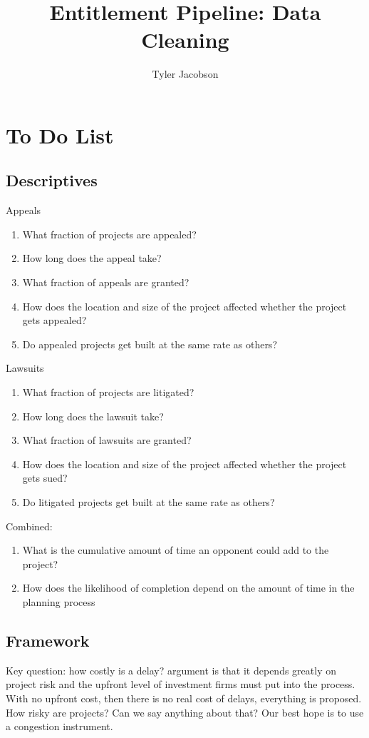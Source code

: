 \documentclass[12pt]{article}
\title{Entitlement Pipeline: Data Cleaning}
\author{Tyler Jacobson}
\theoremstyle{definition}
\begin{document}
\maketitle
\section{To Do List}
\subsection{Descriptives}
Appeals
\begin{enumerate}
    \item What fraction of projects are appealed? 
    \item How long does the appeal take? 
    \item What fraction of appeals are granted?
    \item How does the location and size of the project affected whether the project gets appealed?
    \item Do appealed projects get built at the same rate as others?
\end{enumerate}
Lawsuits
\begin{enumerate}
    \item What fraction of projects are litigated? 
    \item How long does the lawsuit take? 
    \item What fraction of lawsuits are granted?
    \item How does the location and size of the project affected whether the project gets sued?
    \item Do litigated projects get built at the same rate as others?
\end{enumerate}
Combined:
\begin{enumerate}
    \item What is the cumulative amount of time an opponent could add to the project?
    \item How does the likelihood of completion depend on the amount of time in the planning process
\end{enumerate}
\subsection{Framework}
Key question: how costly is a delay? argument is that it depends greatly on project risk and the upfront level of investment firms must put into the process. With no upfront cost, then there is no real cost of delays, everything is proposed. How risky are projects? Can we say anything about that? Our best hope is to use a congestion instrument. 
\end{document}
